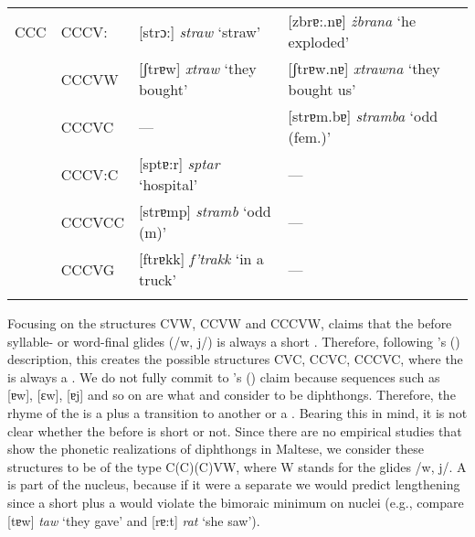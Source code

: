 \documentclass[output=paper]{langsci/langscibook}
\begin{document}
\noindent
\begin{tabularx}{\textwidth}{lXXX}
\lsptoprule
CCC & CCCV: & [strɔ:] 
\newline
\textit{straw} 
\newline‘straw’ & [zbrɐ:.nɐ] 
\newline
\textit{żbrana}
\newline ‘he exploded’\\
\tablevspace
& CCCVW & [ʃtrɐw] 
\newline
\textit{xtraw} 
\newline‘they bought’ & [ʃtrɐw.nɐ] 
\newline
\textit{xtrawna}
\newline ‘they bought us’\\
\tablevspace
& CCCVC & {}--- & [strɐm.bɐ] 
\newline
\textit{stramba }
\newline ‘odd (fem.)’\\
\tablevspace
& CCCV:C & [sptɐ:r] 
\newline
\textit{sptar}
\newline ‘hospital’ & {}---\\
\tablevspace
& CCCVCC & [strɐmp] 
\newline
\textit{stramb} 
\newline‘odd (m)’ & {}---\\
\tablevspace
& CCCVG & [ftrɐkk] 
\newline
\textit{f’trakk} 
\newline‘in a truck’ & {}---\\
\lspbottomrule
\end{tabularx}

Focusing on the structures CVW, CCVW and CCCVW, \citet{camilleri2014stem} claims that the  before syllable- or word-final glides (/w, j/) is always a short . Therefore, following \citeauthor{camilleri2014stem}’s (\citeyear{camilleri2014stem}) description, this creates the possible  structures CVC, CCVC, CCCVC, where the   is always a . We do not fully commit to \citeauthor{camilleri2014stem}’s (\citeyear{camilleri2014stem}) claim because sequences such as [ɐw], [ɛw], [ɐj] and so on are what \citet{azzopardi1981phonetics} and \citet{maltese_book} consider to be diphthongs. Therefore, the rhyme of the  is a  plus a transition to another  or a  \citep[cf.][]{azzopardi1981phonetics}. Bearing this in mind, it is not clear whether the  before is short or not. Since there are no empirical studies that show the phonetic realizations of diphthongs in Maltese, we consider these structures to be of the type C(C)(C)VW, where W stands for the glides /w, j/. A  is part of the nucleus, because if it were a separate  we would predict  lengthening since a short  plus a   would violate the bimoraic minimum on  nuclei (e.g., compare [tɐw] \textit{taw} ‘they gave’ and [rɐ:t] \textit{rat} ‘she saw’). 
\end{document}
